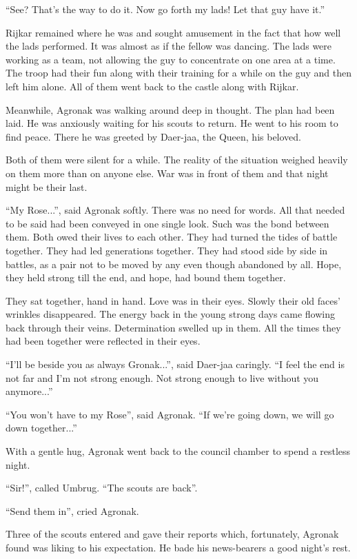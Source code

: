 \documentclass[twoside,11pt]{article}
\begin{document}
``See? That’s the way to do it. Now go forth my lads! Let that guy have it.''

Rijkar remained where he was and sought amusement in the fact that how well the lads performed. It was almost as if the fellow was dancing. The lads were working as a team, not allowing the guy to concentrate on one area at a time. The troop had their fun along with their training for a while on the guy and then left him alone. All of them went back to the castle along with Rijkar.

Meanwhile, Agronak was walking around deep in thought. The plan had been laid. He was anxiously waiting for his scouts to return. He went to his room to find peace. There he was greeted by Daer-jaa, the Queen, his beloved.

Both of them were silent for a while. The reality of the situation weighed heavily on them more than on anyone else. War was in front of them and that night might be their last.

``My Rose...'', said Agronak softly. There was no need for words. All that needed to be said had been conveyed in one single look. Such was the bond between them. Both owed their lives to each other. They had turned the tides of battle together. They had led generations together. They had stood side by side in battles, as a pair not to be moved by any even though abandoned by all. Hope, they held strong till the end, and hope, had bound them together.

They sat together, hand in hand. Love was in their eyes. Slowly their old faces' wrinkles disappeared. The energy back in the young strong days came flowing back through their veins. Determination swelled up in them. All the times they had been together were reflected in their eyes.

``I'll be beside you as always Gronak...'', said Daer-jaa caringly. ``I feel the end is not far and I'm not strong enough. Not strong enough to live without you anymore...''

``You won't have to my Rose'', said Agronak. ``If we're going down, we will go down together...''

With a gentle hug, Agronak went back to the council chamber to spend a restless night.

``Sir!'', called Umbrug. ``The scouts are back''.

``Send them in'', cried Agronak.

Three of the scouts entered and gave their reports which, fortunately, Agronak found was liking to his expectation. He bade his news-bearers a good night's rest.
\end{document}
